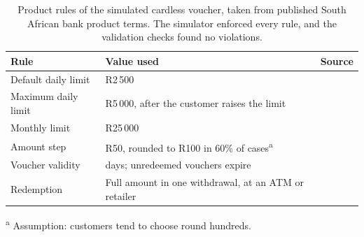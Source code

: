 \begin{table}[htbp]
\centering
\small
\caption{Product rules of the simulated cardless voucher, taken from published South African bank product terms. The simulator enforced every rule, and the validation checks found no violations.}
\label{tab:product-rules}
\begin{tabularx}{\textwidth}{l>{\raggedright\arraybackslash}Xl}
\toprule
Rule & Value used & Source \\
\midrule
Default daily limit  & R2\,500 & \cite{nedbank_cardless_faq} \\
Maximum daily limit  & R5\,000, after the customer raises the limit & \cite{standardbank_instantmoney_tcs,absa_cashsend,nedbank_cardless_faq} \\
Monthly limit        & R25\,000 & \cite{standardbank_instantmoney_tcs,absa_cashsend} \\
Amount step          & R50, rounded to R100 in 60\% of cases\textsuperscript{a} & \cite{absa_cashsend} \\
Voucher validity     & 30 days; unredeemed vouchers expire & \cite{absa_cashsend,nedbank_cardless_faq} \\
Redemption           & Full amount in one withdrawal, at an ATM or retailer & \cite{nedbank_cardless_faq} \\
\bottomrule
\end{tabularx}
\par\smallskip\raggedright\footnotesize \textsuperscript{a} Assumption: customers tend to choose round hundreds.
\end{table}
